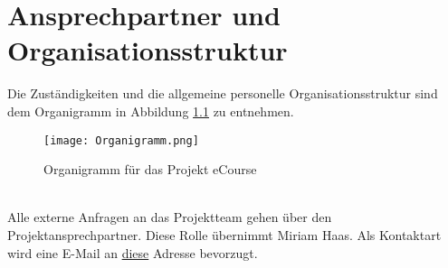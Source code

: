 
\chapter{Ansprechpartner und Organisationsstruktur}
Die Zuständigkeiten und die allgemeine personelle Organisationsstruktur sind dem Organigramm in Abbildung \ref{fib:Organigramm} zu entnehmen.
\begin{figure}[h]
\centering
\texttt{[image: Organigramm.png]}
\caption{Organigramm für das Projekt eCourse}
\label{fib:Organigramm}
\end{figure}\\

Alle externe Anfragen an das Projektteam gehen über den Projektansprechpartner. Diese Rolle übernimmt Miriam Haas. Als Kontaktart wird eine E-Mail an \href{mailto:inf19109@lehre.dhbw-stuttgart.de}{diese} Adresse bevorzugt. 